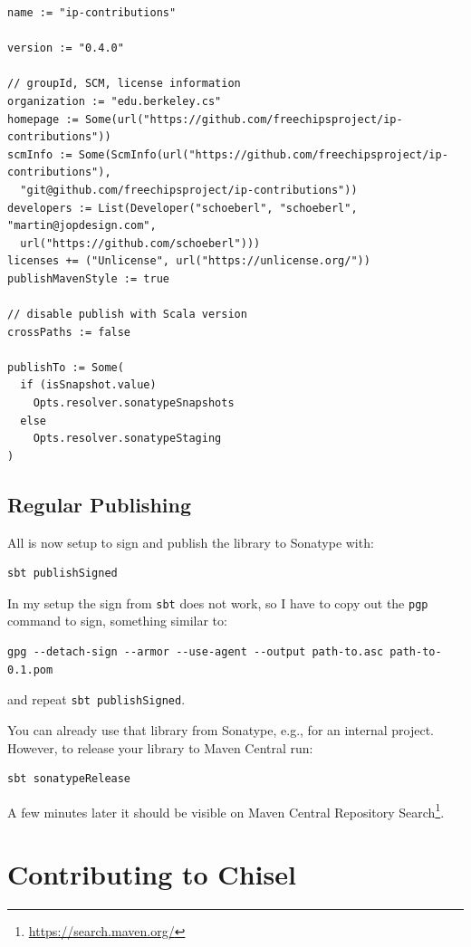 \documentclass[%
    10pt,
    headinclude, footexclude,
    openright, %
    notitlepage,
    cleardoubleempty,
    headsepline,
    pointlessnumbers,
    bibtotoc, idxtotoc,
    ]{scrbook}
\newcommand{\code}[1]{{\small{\texttt{#1}}}}
\newcommand{\myref}[2]{\href{#1}{#2}}
\renewcommand{\myref}[2]{{#2}{\footnote{\url{#1}}}}
\begin{document}
{\small
\begin{verbatim}
name := "ip-contributions"

version := "0.4.0"

// groupId, SCM, license information
organization := "edu.berkeley.cs"
homepage := Some(url("https://github.com/freechipsproject/ip-contributions"))
scmInfo := Some(ScmInfo(url("https://github.com/freechipsproject/ip-contributions"),
  "git@github.com/freechipsproject/ip-contributions"))
developers := List(Developer("schoeberl", "schoeberl", "martin@jopdesign.com",
  url("https://github.com/schoeberl")))
licenses += ("Unlicense", url("https://unlicense.org/"))
publishMavenStyle := true

// disable publish with Scala version
crossPaths := false

publishTo := Some(
  if (isSnapshot.value)
    Opts.resolver.sonatypeSnapshots
  else
    Opts.resolver.sonatypeStaging
)
\end{verbatim}
}

\subsection{Regular Publishing}

All is now setup to sign and publish the library to Sonatype with:

\begin{verbatim}
sbt publishSigned
\end{verbatim}

In my setup the sign from \code{sbt} does not work, so I have to copy
out the \code{pgp} command to sign, something similar to:

\begin{verbatim}
gpg --detach-sign --armor --use-agent --output path-to.asc path-to-0.1.pom
\end{verbatim}

\noindent and repeat \code{sbt publishSigned}.

You can already use that library from Sonatype, e.g., for an internal project.
However, to release your library to Maven Central run:

\begin{verbatim}
sbt sonatypeRelease
\end{verbatim}

A few minutes later it should be visible on \myref{https://search.maven.org/}{Maven Central
Repository Search}.

\section{Contributing to Chisel}
\end{document}
